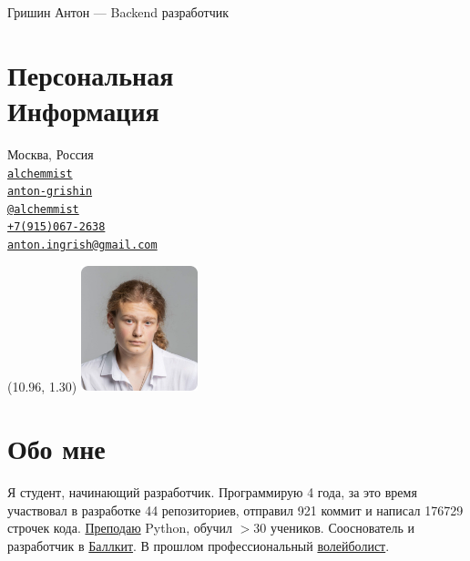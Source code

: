 \documentclass[margin,line]{resume}
\begin{document}
{\vspace*{-13mm}\sc \large Гришин Антон — Backend разработчик} \\
\begin{resume}
  \begin{minipage}[t]{0.55\textwidth}
    \section{\mysidestyle Персональная\\Информация}
    Москва, Россия \\
    \faGithub  \space
    \href{https://github.com/alchemmist/}{\texttt{alchemmist}} \\
    \faLinkedin \space
    \href{https://www.linkedin.com/in/anton-grishin-6966a8362/}{\texttt{anton-grishin}}
    \\
    \faPaperPlane \space \href{https://t.me/alchemmist}{\texttt{@alchemmist}} \\
    \faPhone \space
    \href{tel:+1234567890}{\color{blue}\texttt{+7(915)067-2638}}  \\
    \faEnvelope \space
    \href{mailto:anton.ingrish@gmail.com}{\color{blue}\texttt{anton.ingrish@gmail.com}}
  \end{minipage}

  \begin{minipage}[H]{0.18\textwidth}
    \begin{textblock}{7}(10.96, 1.30)
      \includegraphics[width=0.255\textwidth]{images/avatar.png}
    \end{textblock}
  \end{minipage}

  \vspace{-7mm}
  \section{\mysidestyle Обо мне}
  Я студент, начинающий разработчик. Программирую 4 года, за
  это время участвовал в разработке 44 репозиториев, отправил 921
  коммит и написал 176729 строчек кода.
  \href{https://www.avito.ru/moskva/predlozheniya_uslug/prepodavatel_programmirovaniya_na_python_2556461612}{Преподаю}
  Python, обучил $> 30$ учеников. Сооснователь и
  разработчик в \href{https://ballkit.ru/}{Баллкит}. В прошлом профессиональный
  \href{https://github.com/alchemmist/CV/blob/main/attachments/sport.pdf}{волейболист}.


\end{resume}
\end{document}
